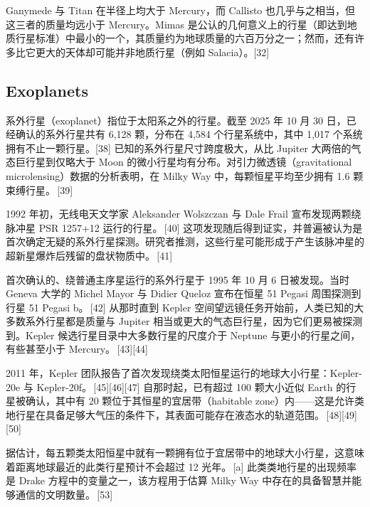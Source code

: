 Ganymede 与 Titan 在半径上均大于 Mercury，而 Callisto 也几乎与之相当，但这三者的质量均远小于 Mercury。Mimas 是公认的几何意义上的行星（即达到地质行星标准）中最小的一个，其质量约为地球质量的六百万分之一；然而，还有许多比它更大的天体却可能并非地质行星（例如 Salacia）。[32]
\subsection{Exoplanets}
系外行星（exoplanet）指位于太阳系之外的行星。截至 2025 年 10 月 30 日，已经确认的系外行星共有 6{,}128 颗，分布在 4{,}584 个行星系统中，其中 1{,}017 个系统拥有不止一颗行星。[38]  
已知的系外行星尺寸跨度极大，从比 Jupiter 大两倍的气态巨行星到仅略大于 Moon 的微小行星均有分布。对引力微透镜（gravitational microlensing）数据的分析表明，在 Milky Way 中，每颗恒星平均至少拥有 1.6 颗束缚行星。\,[39]

\medskip

1992 年初，无线电天文学家 Aleksander Wolszczan 与 Dale Frail 宣布发现两颗绕脉冲星 PSR 1257+12 运行的行星。\,[40] 这项发现随后得到证实，并普遍被认为是首次确定无疑的系外行星探测。研究者推测，这些行星可能形成于产生该脉冲星的超新星爆炸后残留的盘状物质中。\,[41]

\medskip

首次确认的、绕普通主序星运行的系外行星于 1995 年 10 月 6 日被发现。当时 Geneva 大学的 Michel Mayor 与 Didier Queloz 宣布在恒星 51 Pegasi 周围探测到行星 51 Pegasi b。\,[42]  
从那时直到 Kepler 空间望远镜任务开始前，人类已知的大多数系外行星都是质量与 Jupiter 相当或更大的气态巨行星，因为它们更易被探测到。Kepler 候选行星目录中大多数行星的尺度介于 Neptune 与更小的行星之间，有些甚至小于 Mercury。\,[43][44]

\medskip

2011 年，Kepler 团队报告了首次发现绕类太阳恒星运行的地球大小行星：Kepler-20e 与 Kepler-20f。\,[45][46][47]  
自那时起，已有超过 100 颗大小近似 Earth 的行星被确认，其中有 20 颗位于其恒星的宜居带（habitable zone）内——这是允许类地行星在具备足够大气压的条件下，其表面可能存在液态水的轨道范围。\,[48][49][50]  

据估计，每五颗类太阳恒星中就有一颗拥有位于宜居带中的地球大小行星，这意味着距离地球最近的此类行星预计不会超过 12 光年。\,[a]  
此类类地行星的出现频率是 Drake 方程中的变量之一，该方程用于估算 Milky Way 中存在的具备智慧并能够通信的文明数量。\,[53]




